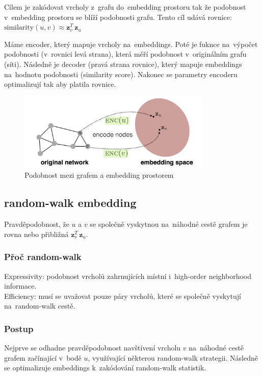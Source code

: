 Cílem je zakódovat vrcholy z~grafu do~embedding prostoru tak že podobnost v~embedding prostoru se blíží podobnosti grafu.
Tento cíl udává rovnice:
$\text{similarity}(u,v)\approx \mathbf{z}_{v}^{T}\,\mathbf{z}_{u}$

Máme encoder, který mapuje vrcholy na~embeddings. 
Poté je fuknce na~výpočet podobnosti (v~rovnici levá strana), která měří podobnost v~originálním grafu (síti).
Následně je decoder (pravá strana rovnice), který mapuje embeddings na~hodnotu podobnosti (similarity score).
Nakonec se parametry encoderu optimalizují tak aby platila rovnice.

\begin{figure}[ht]
    \centering
    \includegraphics[height=10em]{images/11_similarity}
    \caption{Podobnost mezi grafem a embedding prostorem}
\end{figure}

\subsection{random-walk embedding}

Pravděpodobnost, že $u$ a $v$ se společně vyskytnou na~náhodné cestě grafem je rovna nebo přibližná $\mathbf{z}_{v}^{T}\,\mathbf{z}_{u}$.

\subsubsection{Přoč random-walk}

{}Expressivity: podobnost vrcholů zahrnujících místní i~high-order neighborhood informace.
\\Efficiency: musí se uvažovat pouze páry vrcholů, které se společně vyskytují na~random-walk cestě.

\subsubsection{Postup}

Nejprve se odhadne pravděpodobnost navštívení vrcholu $v$ na~náhodné cestě grafem začínající v~bodě $u$, využívající některou random-walk strategii. 
Následně se optimalizuje embeddings k~zakódování random-walk statistik.

